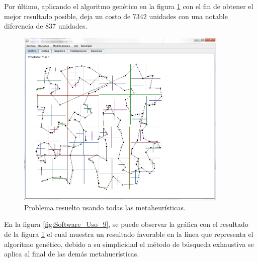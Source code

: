 \hspace*{1cm}Por último, aplicando el algoritmo genético en la figura \ref {fig:Software_Uso_8} con el fin de obtener el mejor resultado posible, deja un costo de 7342 unidades con una notable diferencia de 837 unidades.\\

    \begin{figure}[hbtp]
        \centering
            \includegraphics[width=0.9\textwidth]{Software/Imagenes/Software_Uso_8.png}
            \caption{Problema resuelto usando todas las metaheurísticas.}
            \label{fig:Software_Uso_8}
    \end{figure}
\clearpage \newpage

\hspace*{1cm}En la figura \ref {fig:Software_Uso_9}, se puede observar la gráfica con el resultado de la figura \ref {fig:Software_Uso_8} el cual muestra un resultado favorable en la línea que representa el algoritmo genético, debido a su simplicidad el método de búsqueda exhaustiva se aplica al final de las demás metahuerísticas.\\

